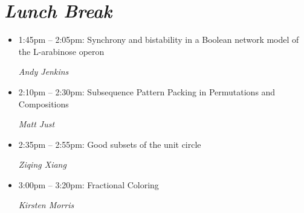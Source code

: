 \documentclass[oneside]{amsart}
\begin{document}
\section*{\textit{Lunch Break}}
\vspace{0.5em}
\begin{itemize}
\setlength\itemsep{1em}

\item 1:45pm -- 2:05pm: Synchrony and bistability in a Boolean network model of the L-arabinose operon \\ \vspace{-1.5em} \begin{flushright}\textit{ Andy Jenkins }\end{flushright}
\item 2:10pm -- 2:30pm: Subsequence Pattern Packing in Permutations and Compositions \\ \vspace{-1.5em} \begin{flushright}\textit{ Matt Just }\end{flushright}
\item 2:35pm -- 2:55pm: Good subsets of the unit circle \\ \vspace{-1.5em} \begin{flushright}\textit{ Ziqing Xiang }\end{flushright}
\item 3:00pm -- 3:20pm: Fractional Coloring \\ \vspace{-1.5em} \begin{flushright}\textit{ Kirsten Morris }\end{flushright}

\end{itemize}
\end{document}
